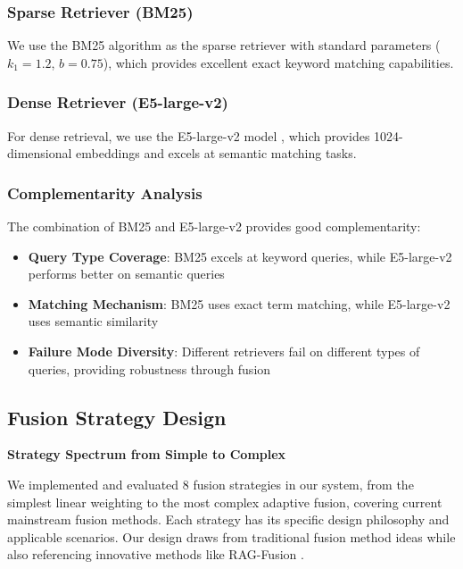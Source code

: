 \documentclass[letterpaper]{article} %
\begin{document}
\subsubsection{Sparse Retriever (BM25)}

We use the BM25 algorithm as the sparse retriever with standard parameters ($k_1 = 1.2$, $b = 0.75$), which provides excellent exact keyword matching capabilities.

\subsubsection{Dense Retriever (E5-large-v2)}

For dense retrieval, we use the E5-large-v2 model \cite{wang2022text}, which provides 1024-dimensional embeddings and excels at semantic matching tasks.

\subsubsection{Complementarity Analysis}

The combination of BM25 and E5-large-v2 provides good complementarity:

\begin{itemize}
\item \textbf{Query Type Coverage}: BM25 excels at keyword queries, while E5-large-v2 performs better on semantic queries\\
\item \textbf{Matching Mechanism}: BM25 uses exact term matching, while E5-large-v2 uses semantic similarity\\
\item \textbf{Failure Mode Diversity}: Different retrievers fail on different types of queries, providing robustness through fusion
\end{itemize}

\subsection{Fusion Strategy Design}

\textbf{Strategy Spectrum from Simple to Complex}

We implemented and evaluated 8 fusion strategies in our system, from the simplest linear weighting to the most complex adaptive fusion, covering current mainstream fusion methods. Each strategy has its specific design philosophy and applicable scenarios. Our design draws from traditional fusion method ideas while also referencing innovative methods like RAG-Fusion \cite{rackauckas2024rag}.
\end{document}
